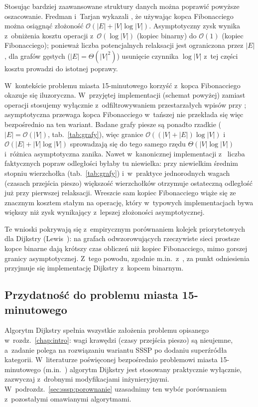 Stosując bardziej zaawansowane struktury danych można poprawić powyższe
oszacowanie. Fredman i~Tarjan wykazali \cite{fredman1987fibonacci}, że używając kopca
Fibonacciego można osiągnąć złożoność $\mathcal{O}(|E| + |V|\log|V|)$.
Asymptotyczny zysk wynika z~obniżenia kosztu operacji 
z~$\mathcal{O}(\log|V|)$ (kopiec binarny) do $\mathcal{O}(1)$ (kopiec Fibonacciego); ponieważ liczba potencjalnych
relaksacji jest ograniczona przez $|E|$, dla grafów gęstych
(${|E|=\Theta(|V|^2)}$) usunięcie czynnika $\log|V|$ z~tej części kosztu
prowadzi do istotnej poprawy.

W~kontekście problemu miasta 15-minutowego korzyść z~kopca Fibonacciego okazuje
się iluzoryczna. W~przyjętej implementacji (schemat powyżej) zamiast operacji
 stosujemy wyłącznie  z~odfiltrowywaniem
przestarzałych wpisów przy ; asymptotyczna przewaga kopca
Fibonacciego w~tańszej  nie przekłada się więc bezpośrednio
na ten wariant. Badane grafy piesze są ponadto rzadkie ($|E|=\mathcal{O}(|V|)$,
tab.~\ref{tab:grafy}), więc granice $\mathcal{O}((|V|+|E|)\log|V|)$ i
$\mathcal{O}(|E|+|V|\log|V|)$ sprowadzają się do tego samego rzędu
$\Theta(|V|\log|V|)$ i~różnica asymptotyczna zanika. Nawet w~kanonicznej
implementacji z~ liczba faktycznych popraw odległości byłaby
tu niewielka: przy niewielkim średnim stopniu wierzchołka (tab.~\ref{tab:grafy})
i~w~praktyce jednorodnych wagach (czasach przejścia pieszo) większość
wierzchołków otrzymuje ostateczną odległość już przy pierwszej relaksacji.
Wreszcie sam kopiec Fibonacciego wiąże się ze znacznym kosztem stałym na
operację, który w~typowych implementacjach bywa większy niż zysk wynikający
z~lepszej złożoności asymptotycznej.

Te wnioski pokrywają się z~empirycznym porównaniem kolejek priorytetowych
dla Dijkstry (Lewis~\cite{lewis2023dijkstra_pq}): na grafach odwzorowujących
rzeczywiste sieci prostsze kopce binarne dają krótszy czas
obliczeń niż kopiec Fibonacciego, mimo gorszej granicy asymptotycznej.
Z~tego powodu, zgodnie m.in.\ z~\cite{Lam2024}, za punkt odniesienia przyjmuje
się implementację Dijkstry z~kopcem binarnym.

\subsection{Przydatność do problemu miasta 15-minutowego}

Algorytm Dijkstry spełnia wszystkie założenia problemu opisanego
w~rozdz.~\ref{chap:intro}: wagi krawędzi (czasy przejścia pieszo) są
nieujemne, a~zadanie polega na rozwiązaniu wariantu SSSP po dodaniu
superźródła kategorii. W~literaturze poświęconej bezpośrednio problemowi
miasta 15-minutowego (m.in.\ \cite{Lam2024,barbieri2023graph,olivari2023presenting})
algorytm Dijkstry jest stosowany praktycznie wyłącznie, zazwyczaj
z~drobnymi modyfikacjami inżynieryjnymi. W~podrozdz.~\ref{sec:sssp:porownanie} uzasadnimy ten wybór porównaniem
z~pozostałymi omawianymi algorytmami.


